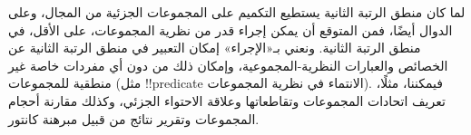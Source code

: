 \documentclass[../../../include/open-logic-section]{subfiles}
\begin{document}


لما كان منطق الرتبة الثانية يستطيع التكميم على المجموعات الجزئية من
المجال، وعلى الدوال أيضًا، فمن المتوقع أن يمكن إجراء قدر من نظرية
المجموعات، على الأقل، في منطق الرتبة الثانية. ونعني بـ«الإجراء» إمكان
التعبير في منطق الرتبة الثانية عن الخصائص والعبارات النظرية-المجموعية،
وإمكان ذلك من دون أي مفردات خاصة غير منطقية للمجموعات (مثل
!!{predicate} الانتماء في نظرية المجموعات). فيمكننا، مثلًا، تعريف
اتحادات المجموعات وتقاطعاتها وعلاقة الاحتواء الجزئي، وكذلك مقارنة أحجام
المجموعات وتقرير نتائج من قبيل مبرهنة كانتور.
\end{document}

